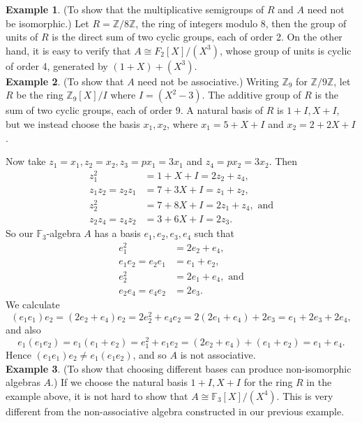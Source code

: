 \documentclass[12pt]{article}
\begin{document}
\noindent
\textbf{Example 1}. (To show that the multiplicative semigroups of $R$ and $A$ need not be isomorphic.) Let  $R = \mathbb{Z}/8\mathbb{Z}$, the ring of integers modulo 8, then the group of units of $R$ is the direct sum of two cyclic groups, each of order 2. On the other hand, it is easy to verify that $A \cong F_{2}[X]/(X^{3})$, whose group of units is cyclic of order 4, generated by $(1 + X) + (X^{3})$. \\

\noindent
\textbf{Example 2}. (To show that $A$ need not be associative.) Writing $\mathbb{Z}_9$ for $\mathbb{Z}/9\mathbb{Z}$, let $R$ be the ring $\mathbb{Z}_9[X]/I$ where $I=(X^2-3)$. The additive group of $R$ is the sum of two cyclic groups, each of order $9$. A natural basis of $R$ is $1+I,X+I$, but we instead choose the basis $x_1,x_2$, where $x_1=5+X+I$ and $x_2=2+2X+I$. 
\par Now take $z_{1} = x_{1}, z_{2} = x_{2}, z_{3} = px_{1} = 3x_{1}$ and $z_{4} = px_{2} = 3x_{2}$. Then
\begin{align*}
z_{1}^{2} & =  1+X+I =  2z_{2} + z_{4}, \\
z_{1}z_{2} = z_2z_1 &=7+3X +I =  z_{1} + z_{2},\\
z_{2}^{2} & =  7+8X +I= 2z_{1} + z_{4}, \text{ and}\\
z_{2}z_{4}  = z_{4}z_2  &= 3+6X+I= 2z_{3}.
\end{align*}
So our $\mathbb{F}_3$-algebra $A$ has a basis $e_1,e_2,e_3,e_4$ such that
\begin{align*}
e_{1}^{2} &  =2e_{2} + e_{4}, \\
e_{1}e_{2} = e_2e_1 &=  e_{1} + e_{2},\\
e_{2}^{2} & = 2e_{1} + e_{4}, \text{ and}\\
e_{2}e_{4}  = e_{4}e_2  &= 2e_{3}.
\end{align*}
We calculate
\[
(e_{1}e_1) e_{2} = (2e_{2} + e_{4})e_{2} = 2e_{2}^{2} + e_{4}e_{2} = 2(2e_{1} + e_{4}) + 2e_{3}
=  e_{1} + 2e_{3} + 2e_{4},
\]
and also
\[
e_{1}(e_{1}e_{2})= e_{1}(e_{1} + e_{2}) = e_{1}^{2} + e_{1}e_{2} = (2e_{2} + e_{4}) + (e_{1} + e_{2})
= e_{1} + e_{4}.
\]
Hence $(e_{1}e_1) e_{2}\neq e_{1}(e_{1}e_{2})$, and so $A$ is not associative. \\

\noindent
\textbf{Example 3}. (To show that choosing different bases can produce non-isomorphic algebras $A$.) If we choose the natural basis $1+I,X+I$ for the ring $R$ in the example above, it is not hard to show that $A \cong \mathbb{F}_{3}[X]/(X^{4})$. This is very different from the non-associative algebra constructed in our previous example. \\
\end{document}
